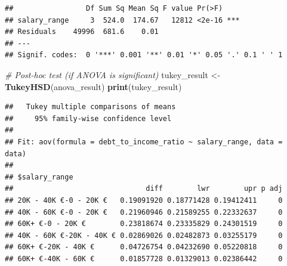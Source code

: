 \documentclass[
]{article}
\newenvironment{Shaded}{\begin{snugshade}}{\end{snugshade}}
\newcommand{\AttributeTok}[1]{\textcolor[rgb]{0.13,0.29,0.53}{#1}}
\newcommand{\CommentTok}[1]{\textcolor[rgb]{0.56,0.35,0.01}{\textit{#1}}}
\newcommand{\FunctionTok}[1]{\textcolor[rgb]{0.13,0.29,0.53}{\textbf{#1}}}
\newcommand{\NormalTok}[1]{#1}
\newcommand{\OtherTok}[1]{\textcolor[rgb]{0.56,0.35,0.01}{#1}}
\newcommand{\SpecialCharTok}[1]{\textcolor[rgb]{0.81,0.36,0.00}{\textbf{#1}}}
\newcommand{\StringTok}[1]{\textcolor[rgb]{0.31,0.60,0.02}{#1}}
\begin{document}
\begin{verbatim}
##                 Df Sum Sq Mean Sq F value Pr(>F)    
## salary_range     3  524.0  174.67   12812 <2e-16 ***
## Residuals    49996  681.6    0.01                   
## ---
## Signif. codes:  0 '***' 0.001 '**' 0.01 '*' 0.05 '.' 0.1 ' ' 1
\end{verbatim}

\begin{Shaded}
\begin{Highlighting}[]
\CommentTok{\# Post{-}hoc test (if ANOVA is significant)}
\NormalTok{tukey\_result }\OtherTok{\textless{}{-}} \FunctionTok{TukeyHSD}\NormalTok{(anova\_result)}
\FunctionTok{print}\NormalTok{(tukey\_result)}
\end{Highlighting}
\end{Shaded}

\begin{verbatim}
##   Tukey multiple comparisons of means
##     95% family-wise confidence level
## 
## Fit: aov(formula = debt_to_income_ratio ~ salary_range, data = data)
## 
## $salary_range
##                               diff        lwr        upr p adj
## 20K - 40K €-0 - 20K €   0.19091920 0.18771428 0.19412411     0
## 40K - 60K €-0 - 20K €   0.21960946 0.21589255 0.22332637     0
## 60K+ €-0 - 20K €        0.23818674 0.23335829 0.24301519     0
## 40K - 60K €-20K - 40K € 0.02869026 0.02482873 0.03255179     0
## 60K+ €-20K - 40K €      0.04726754 0.04232690 0.05220818     0
## 60K+ €-40K - 60K €      0.01857728 0.01329013 0.02386442     0
\end{verbatim}

\begin{Shaded}
\end{Shaded}
\end{document}
